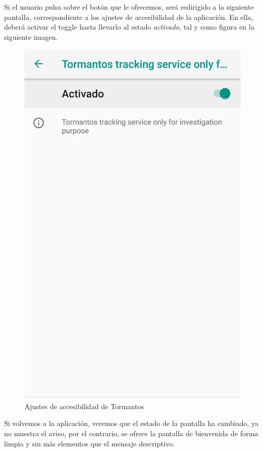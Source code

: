 \documentclass[12pt,a4paper,oneside]{book} %
\begin{document}
Si el usuario pulsa sobre el botón que le ofrecemos, será redirigido a la siguiente pantalla, correspondiente a los ajustes de accesibilidad de la aplicación. En ella, deberá activar el toggle hasta llevarlo al estado \textit{activado}, tal y como figura en la siguiente imagen. 
\begin{figure}[H]
	\begin{center}
     	\includegraphics[scale=0.2]{pictures/capsapp/accessibility.png}
	    	\caption{Ajustes de accesibilidad de Tormantos}
    	\label{fig:Ajustes de accesibilidad de Tormantos}
	\end{center}
\end{figure}
Si volvemos a la aplicación, veremos que el estado de la pantalla ha cambiado, ya no muestra el aviso, por el contrario, se ofrece la pantalla de bienvenida de forma limpia y sin más elementos que el mensaje descriptivo. 
\end{document}

